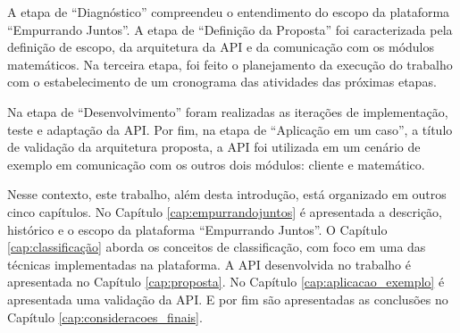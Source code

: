 A etapa de ``Diagnóstico'' compreendeu o entendimento do escopo da plataforma ``Empurrando Juntos''. 
A etapa de ``Definição da Proposta'' foi caracterizada pela definição de escopo, 
da arquitetura da API e da comunicação com os módulos matemáticos. Na terceira etapa, 
foi feito o planejamento da execução do trabalho com o estabelecimento
de um cronograma das atividades das próximas etapas. 

Na etapa de ``Desenvolvimento'' foram realizadas as iterações de implementação, teste e adaptação da API. 
Por fim, na etapa de ``Aplicação em um caso'', a título de validação da arquitetura proposta,
a API foi utilizada em um cenário de exemplo em comunicação com os outros dois módulos: cliente e matemático.

Nesse contexto, este trabalho, além desta introdução, está organizado em outros cinco capítulos.
No Capítulo \ref{cap:empurrandojuntos} é apresentada a descrição, histórico e o escopo da plataforma ``Empurrando Juntos''.
O Capítulo \ref{cap:classificação} aborda os conceitos de classificação, com foco em uma das técnicas implementadas na plataforma. 
A API desenvolvida no trabalho é apresentada no Capítulo \ref{cap:proposta}. No Capítulo \ref{cap:aplicacao_exemplo} é
apresentada uma validação da API. E por fim são apresentadas as conclusões no Capítulo \ref{cap:consideracoes_finais}.
